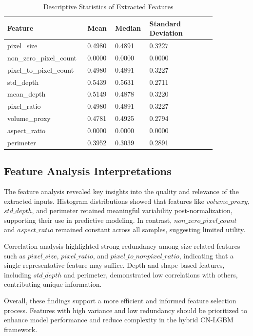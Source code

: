 \begin{longtable}{| p{0.30\linewidth} | p{0.12\linewidth} | p{0.13\linewidth} | p{0.30\linewidth} |}
	\caption{Descriptive Statistics of Extracted Features}
	\label{tab:Descriptive Statistics of Extracted Features}\\
	\hline
	\textbf{Feature} & \textbf{Mean} & \textbf{Median} & \textbf{Standard Deviation} \\
	\hline
	pixel\_size
	& 
	0.4980 
	&
	0.4891
	&
	0.3227
	\\
	\hline
	non\_zero\_pixel\_count
	& 
	0.0000 
	&
	0.0000
	&
	0.0000
	\\
	\hline
	pixel\_to\_pixel\_count
	& 
	0.4980 
	&
	0.4891
	&
	0.3227
	\\
	\hline
	std\_depth
	& 
	0.5439 
	&
	0.5631
	&
	0.2711
	\\
	\hline
	mean\_depth
	& 
	0.5149 
	&
	0.4878
	&
	0.3220
	\\
	\hline
	pixel\_ratio
	& 
	0.4980 
	&
	0.4891
	&
	0.3227
	\\
	\hline
	volume\_proxy
	& 
	0.4781 
	&
	0.4925
	&
	0.2794
	\\
	\hline
	aspect\_ratio
	& 
	0.0000 
	&
	0.0000
	&
	0.0000
	\\
	\hline
	perimeter
	& 
	0.3952 
	&
	0.3039
	&
	0.2891
	\\
	\hline
\end{longtable}

\subsection{Feature Analysis Interpretations}

The feature analysis revealed key insights into the quality and relevance of the extracted inputs. Histogram distributions showed that features like $volume\_proxy$, $std\_depth$, and perimeter retained meaningful variability post-normalization, supporting their use in predictive modeling. In contrast, $non\_zero\_pixel\_count$ and $aspect\_ratio$ remained constant across all samples, suggesting limited utility.

Correlation analysis highlighted strong redundancy among size-related features such as $pixel\_size$, $pixel\_ratio$, and $pixel\_to\_nonpixel\_ratio$, indicating that a single representative feature may suffice. Depth and shape-based features, including $std\_depth$ and perimeter, demonstrated low correlations with others, contributing unique information.

Overall, these findings support a more efficient and informed feature selection process. Features with high variance and low redundancy should be prioritized to enhance model performance and reduce complexity in the hybrid CN-LGBM framework.

